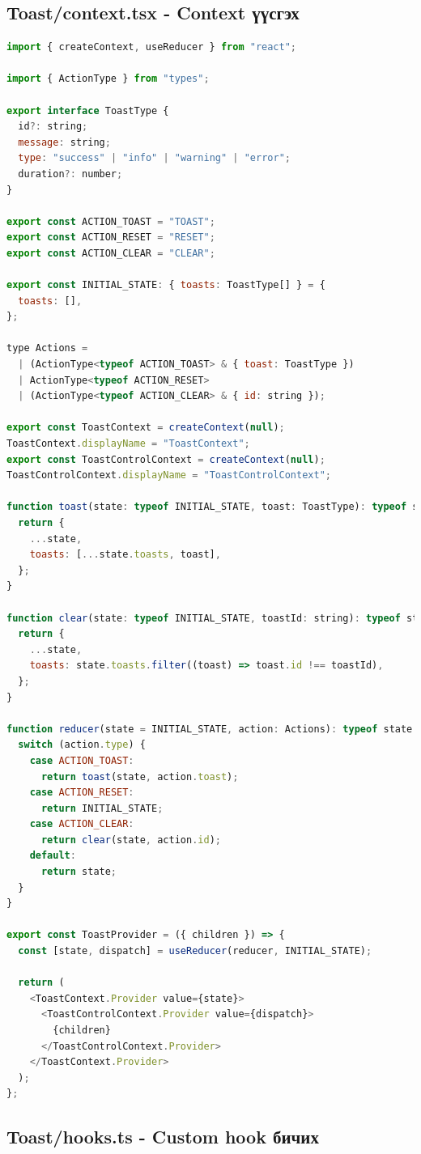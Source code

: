 \subsection{Toast/context.tsx - Context үүсгэх}
\begin{lstlisting}[language=Javascript, frame=single]
import { createContext, useReducer } from "react";

import { ActionType } from "types";

export interface ToastType {
  id?: string;
  message: string;
  type: "success" | "info" | "warning" | "error";
  duration?: number;
}

export const ACTION_TOAST = "TOAST";
export const ACTION_RESET = "RESET";
export const ACTION_CLEAR = "CLEAR";

export const INITIAL_STATE: { toasts: ToastType[] } = {
  toasts: [],
};

type Actions =
  | (ActionType<typeof ACTION_TOAST> & { toast: ToastType })
  | ActionType<typeof ACTION_RESET>
  | (ActionType<typeof ACTION_CLEAR> & { id: string });

export const ToastContext = createContext(null);
ToastContext.displayName = "ToastContext";
export const ToastControlContext = createContext(null);
ToastControlContext.displayName = "ToastControlContext";

function toast(state: typeof INITIAL_STATE, toast: ToastType): typeof state {
  return {
    ...state,
    toasts: [...state.toasts, toast],
  };
}

function clear(state: typeof INITIAL_STATE, toastId: string): typeof state {
  return {
    ...state,
    toasts: state.toasts.filter((toast) => toast.id !== toastId),
  };
}

function reducer(state = INITIAL_STATE, action: Actions): typeof state {
  switch (action.type) {
    case ACTION_TOAST:
      return toast(state, action.toast);
    case ACTION_RESET:
      return INITIAL_STATE;
    case ACTION_CLEAR:
      return clear(state, action.id);
    default:
      return state;
  }
}

export const ToastProvider = ({ children }) => {
  const [state, dispatch] = useReducer(reducer, INITIAL_STATE);

  return (
    <ToastContext.Provider value={state}>
      <ToastControlContext.Provider value={dispatch}>
        {children}
      </ToastControlContext.Provider>
    </ToastContext.Provider>
  );
};
\end{lstlisting}

\subsection{Toast/hooks.ts - Custom hook бичих}

